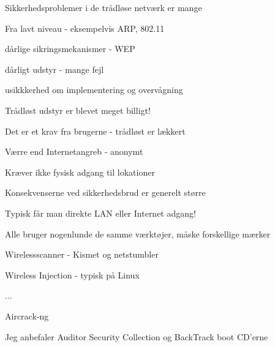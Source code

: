 
\begin{list1}
\item Sikkerhedsproblemer i de trådløse netværk er mange
  \begin{list2}
  \item Fra lavt niveau - eksempelvis ARP, 802.11
  \item dårlige sikringsmekanismer - WEP
  \item dårligt udstyr - mange fejl
  \item usikkkerhed om implementering og overvågning
  \end{list2}
\item Trådløst udstyr er blevet meget billigt!
\item Det er et krav fra brugerne - trådløst er lækkert
\end{list1}




\begin{list2}
\item Værre end Internetangreb - anonymt
\item Kræver ikke fysisk adgang til lokationer
\item Konsekvenserne ved sikkerhedsbrud er generelt større
\item Typisk får man direkte LAN eller Internet adgang!
\end{list2}


\begin{list1}
\item Alle bruger nogenlunde de samme værktøjer, måske forskellige
  mærker
\begin{list2}
\item Wirelessscanner - Kismet og netstumbler
\item Wireless Injection - typisk på Linux
\item ...
\item Aircrack-ng
\end{list2}
\item Jeg anbefaler Auditor Security Collection og BackTrack boot CD'erne
\end{list1}



